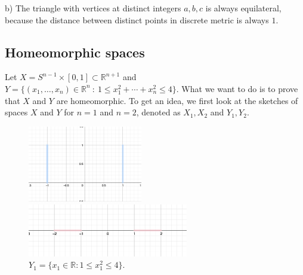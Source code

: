 \documentclass[a4paper,11pt]{article}
\begin{document}
\noindent
b) The triangle with vertices at distinct integers $a, b, c$ is always equilateral, because the distance between distinct points in discrete metric is always $1$.


\subsection{Homeomorphic spaces}

Let $X = S^{n - 1} \times [0,1] \subset \mathbb{R}^{n+1}$ and $Y = \{ (x_1, \ldots, x_n) \in \mathbb{R}^n \ : \ 1 \leq x_1^2 + \cdots + x_n^2 \leq 4 \}$. What we want to do is to prove that $X$ and $Y$ are homeomorphic.
To get an idea, we first look at the sketches of spaces $X$ and $Y$ for $n = 1$ and $n = 2$, denoted as $X_1, X_2$ and $Y_1, Y_2$.
\\

\begin{figure}[ht!]
     \begin{minipage}{0.5\textwidth}
         \centering
         \includegraphics[width=50mm]{X_n1.png}
         \caption{$X_1 = S^0 \times [0,1] \subset \mathbb{R}^2$.}
       \end{minipage}\hfill
     \begin{minipage}{0.5\textwidth}
         \centering
         \includegraphics[width=70mm]{Y_n1.png}
         \caption{$ Y_1 = \{ x_1 \in \mathbb{R} : 1 \leq x_1^2 \leq 4 \}$.}
       \end{minipage}\hfill
    \end{figure}
\end{document}
